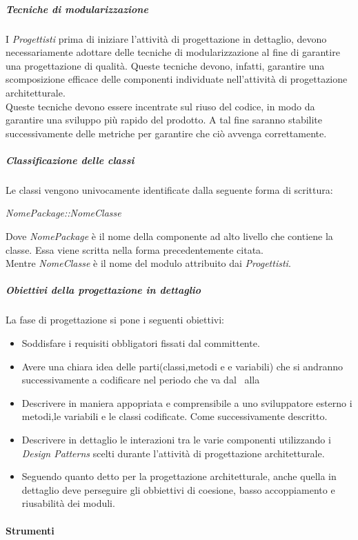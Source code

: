 \subparagraph{Tecniche di modularizzazione}

I \textit{Progettisti} prima di iniziare l'attività di progettazione in dettaglio, devono necessariamente adottare delle tecniche di modularizzazione al fine di garantire una progettazione di qualità. Queste tecniche devono, infatti, garantire una scomposizione efficace delle componenti individuate nell'attività di progettazione architetturale. \\
Queste tecniche devono essere incentrate sul riuso del codice, in modo da garantire una sviluppo più rapido del prodotto. A tal fine saranno stabilite successivamente delle metriche per garantire che ciò avvenga correttamente.

\subparagraph{Classificazione delle classi}

Le classi vengono univocamente identificate dalla seguente forma di scrittura:
\begin{center}
\textit{NomePackage::NomeClasse}
\end{center}

Dove \textit{NomePackage} è il nome della componente ad alto livello che contiene la classe. Essa viene scritta nella forma precedentemente citata. \\
Mentre \textit{NomeClasse} è il nome del modulo attribuito dai \textit{Progettisti}.

\subparagraph{Obiettivi della progettazione in dettaglio}
La fase di progettazione si pone i seguenti obiettivi:
\begin{itemize}
\item Soddisfare i requisiti obbligatori fissati dal committente.
\item Avere una chiara idea delle parti(classi,metodi e e variabili) che si andranno successivamente a codificare nel periodo che va dal \RP\ alla \RQ
\item Descrivere in maniera appopriata e comprensibile a uno sviluppatore esterno i metodi,le variabili e le classi codificate. Come successivamente descritto.
\item Descrivere in dettaglio le interazioni tra le varie componenti utilizzando i \textit{Design Patterns} scelti durante l'attività di progettazione architetturale.
\item Seguendo quanto detto per la progettazione architetturale, anche quella in dettaglio deve perseguire gli obbiettivi di coesione, basso accoppiamento e riusabilità dei moduli.
\end{itemize}

\paragraph{Strumenti}

